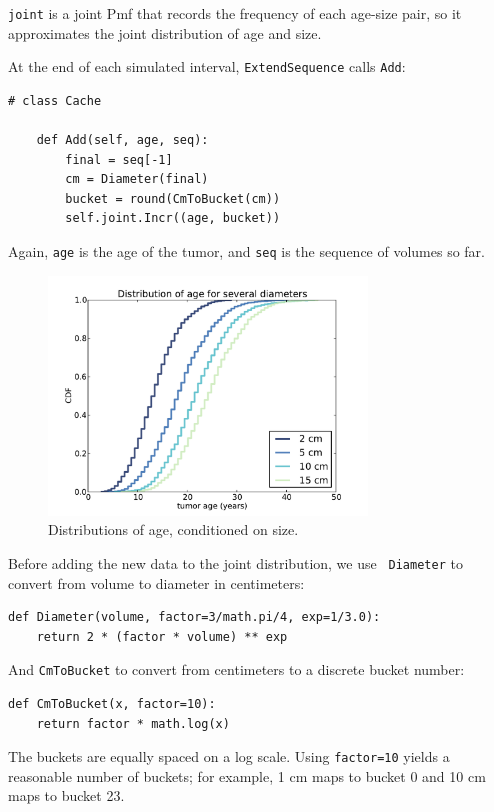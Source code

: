 \documentclass[12pt]{book}
\begin{document}
{\tt joint} is a joint Pmf that records the
frequency of each age-size pair, so it approximates the
joint distribution of age and size.

At the end of each simulated interval, {\tt ExtendSequence} calls
{\tt Add}:

\begin{verbatim}
# class Cache

    def Add(self, age, seq):
        final = seq[-1]
        cm = Diameter(final)
        bucket = round(CmToBucket(cm))
        self.joint.Incr((age, bucket))
\end{verbatim}

Again, {\tt age} is the age of the tumor, and {\tt seq} is the
sequence of volumes so far.

\begin{figure}
\centerline{\includegraphics[height=2.5in]{figs/kidney6.pdf}}
\caption{Distributions of age, conditioned on size.}
\label{fig.kidney6}
\end{figure}

Before adding the new data to the joint distribution, we use {\tt
  Diameter} to convert from volume to diameter in centimeters:

\begin{verbatim}
def Diameter(volume, factor=3/math.pi/4, exp=1/3.0):
    return 2 * (factor * volume) ** exp
\end{verbatim}

And
{\tt CmToBucket} to convert from centimeters to a discrete bucket
number:

\begin{verbatim}
def CmToBucket(x, factor=10):
    return factor * math.log(x)
\end{verbatim}

The buckets are equally spaced on a log scale.  Using {\tt factor=10}
yields a reasonable number of buckets; for example,
1 cm maps to bucket 0 and 10 cm maps to bucket 23.
\end{document}
